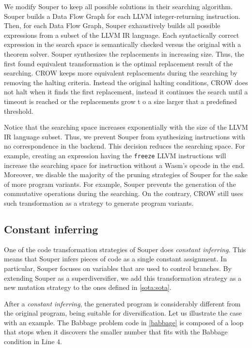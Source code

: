 We modify Souper to keep all possible solutions in their searching algorithm.
Souper builds a Data Flow Graph for each LLVM integer-returning instruction. 
Then, for each Data Flow Graph, Souper exhaustively builds all possible expressions from a subset of the LLVM IR language.
Each syntactically correct expression in the search space is semantically checked versus the original with a theorem solver. Souper synthesizes the replacements in increasing size. Thus, the first found equivalent transformation is the optimal replacement result of the searching. 
CROW keeps more equivalent replacements during the searching by removing the halting criteria. Instead the original halting conditions, CROW does not halt when it finds the first replacement, instead it continues the search until a timeout is reached or the replacements grow t o a size larger that a predefined threshold. 

Notice that the searching space increases exponentially with the size of the LLVM IR language subset. Thus,
we prevent Souper from synthesizing instructions with no correspondence in the \wasm backend. This decision reduces the searching space. For example, creating an expression having the  \texttt{freeze} LLVM instructions will increase the searching space for instruction without a Wasm's opcode in the end.
Moreover, we disable the majority of the pruning strategies of Souper for the sake of more program variants.
For example, Souper prevents the generation of the commutative operations during the searching.
On the contrary, CROW still uses such transformation as a strategy to generate program variants. 

\subsection{Constant inferring}

One of the code transformation strategies of Souper does \emph{constant inferring}. This means that Souper infers pieces of code as a single constant assignment. In particular, Souper focuses on variables that are used to control branches.
By extending Souper as a superdiversifier, we add this transformation strategy as a new mutation strategy to the ones defined in \autoref{sota:sota}. 


After a \emph{constant inferring}, the generated program is considerably different from the original program, being suitable for diversification.
Let us illustrate the case with an example.
The Babbage problem code in \autoref{babbage} is composed of a loop that stops when it discovers the smaller number that fits with the Babbage condition in Line 4.


